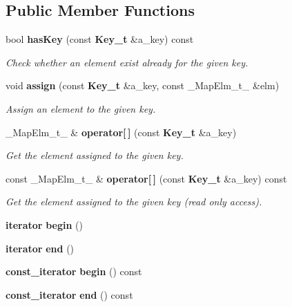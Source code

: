 \subsection*{Public Member Functions}
\begin{DoxyCompactItemize}
\item 
bool {\bf hasKey} (const {\bf Key\_\-t} \&a\_\-key) const \label{classhistmgr_1_1KeyMap__t_aa9036fe4ff391f5b7136b9dfb4c89a1b}

\begin{DoxyCompactList}\small\item\em Check whether an element exist already for the given key. \item\end{DoxyCompactList}\item 
void {\bf assign} (const {\bf Key\_\-t} \&a\_\-key, const \_\-MapElm\_\-t\_\- \&elm)
\begin{DoxyCompactList}\small\item\em Assign an element to the given key. \item\end{DoxyCompactList}\item 
\_\-MapElm\_\-t\_\- \& {\bf operator[$\,$]} (const {\bf Key\_\-t} \&a\_\-key)
\begin{DoxyCompactList}\small\item\em Get the element assigned to the given key. \item\end{DoxyCompactList}\item 
const \_\-MapElm\_\-t\_\- \& {\bf operator[$\,$]} (const {\bf Key\_\-t} \&a\_\-key) const 
\begin{DoxyCompactList}\small\item\em Get the element assigned to the given key (read only access). \item\end{DoxyCompactList}\item 
{\bf iterator} {\bfseries begin} ()\label{classhistmgr_1_1KeyMap__t_a6ae54175e1f99ac32dc131a059c7a7ad}

\item 
{\bf iterator} {\bfseries end} ()\label{classhistmgr_1_1KeyMap__t_ac9b146e882cd7797c72b9726b0adbb70}

\item 
{\bf const\_\-iterator} {\bfseries begin} () const \label{classhistmgr_1_1KeyMap__t_a922213bbe19da6f1193bef396c145e53}

\item 
{\bf const\_\-iterator} {\bfseries end} () const \label{classhistmgr_1_1KeyMap__t_a7536d781834f271a6edb0ed965b2f286}

\end{DoxyCompactItemize}
